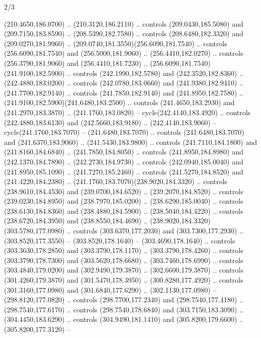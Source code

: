 \begin{flagdescription}{2/3}
\begin{scope}[xshift=0.5\flaglength,yshift=0.5\flagwidth,scale=\flagwidth/259.2]
\begin{scope}[y=0.8pt, x=0.8pt, yscale=-1,shift={(-243,-162)}]
      (210.4650,186.0700) .. (210.3120,186.2110) .. controls (209.0430,185.5080) and
      (209.7150,183.8590) .. (208.5390,182.7580) .. controls (208.6480,182.3320) and
      (209.0270,181.9960) .. (209.0740,181.3550)(256.6090,181.7540) .. controls
      (256.6090,181.7540) and (256.5000,181.9060) .. (256.4410,182.0270) .. controls
      (256.3790,181.9060) and (256.4410,181.7230) ..
      (256.6090,181.7540)(241.9100,182.5900) .. controls (242.1990,182.5780) and
      (242.3520,182.8360) .. (242.4880,183.0200) .. controls (242.0780,183.0660) and
      (241.9380,182.9410) .. (241.7700,182.9140) .. controls (241.7850,182.9140) and
      (241.8950,182.7580) .. (241.9100,182.5900)(241.6480,183.2500) .. controls
      (241.4650,183.2930) and (241.2970,183.3870) .. (241.1760,183.0820) --
      cycle(242.4140,183.4920) .. controls (242.4880,183.6130) and
      (242.5660,183.9180) .. (242.4140,183.9060) -- cycle(241.1760,183.7070) --
      (241.6480,183.7070) .. controls (241.6480,183.7070) and (241.6370,183.9060) ..
      (241.5430,183.9800) .. controls (241.7110,184.1800) and (241.8160,184.6840) ..
      (241.7850,184.8050) .. controls (241.8950,184.8980) and (242.1370,184.7890) ..
      (242.2730,184.9730) .. controls (242.0940,185.0040) and (241.8950,185.1090) ..
      (241.7270,185.2460) .. controls (241.5270,184.8520) and (241.4220,184.2380) ..
      (241.1760,183.7070)(238.9020,184.3320) .. controls (238.9610,184.4530) and
      (239.0700,184.6520) .. (239.2070,184.8520) .. controls (239.0230,184.8950) and
      (238.7970,185.0200) .. (238.6290,185.0040) .. controls (238.6130,184.8360) and
      (238.4880,184.5900) .. (238.5040,184.4220) .. controls (238.6720,184.3950) and
      (238.8550,184.4690) .. (238.9020,184.3320)(303.5780,177.0980) .. controls
      (303.6370,177.2030) and (303.7300,177.2930) .. (303.8520,177.3550) --
      (303.8520,178.1640) -- (303.4690,178.1640) .. controls (303.3630,178.2850) and
      (303.3790,178.1170) .. (303.3790,178.4260) .. controls (303.3790,178.7300) and
      (303.5620,178.6680) .. (303.7460,178.6990) .. controls (303.4840,179.0200) and
      (302.9490,179.3870) .. (302.6600,179.3870) .. controls (301.4260,179.3870) and
      (301.5470,178.3950) .. (300.8280,177.4920) .. controls (301.3160,177.0980) and
      (301.6840,177.6290) .. (302.1130,177.0980) -- (298.8120,177.0820) .. controls
      (298.7700,177.2340) and (298.7540,177.4180) .. (298.7540,177.6170) .. controls
      (298.7540,178.6840) and (303.7150,183.3090) .. (304.4450,183.6290) .. controls
      (304.9490,181.1410) and (305.8200,179.6600) .. (305.8200,177.3120) --

\end{scope}
\end{scope}
\end{flagdescription}
